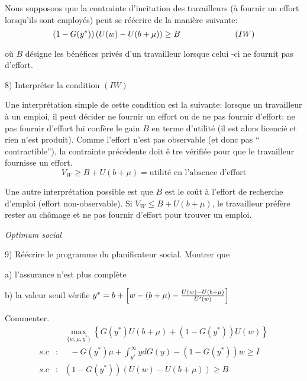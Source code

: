 \documentclass[a4paper]{article}
\begin{document}
\bigskip \pagebreak

Nous supposons que la contrainte d'incitation des travailleurs (\`{a}
fournir un effort lorsqu'ils sont employ\'{e}s) peut se r\'{e}\'{e}crire de
la mani\`{e}re suivante:%
\begin{equation*}
\left( 1-G(y^{\ast })\right) \left( U(w)-U(b+\mu )\right) \geq B\text{ \ \ \
\ \ \ \ \ \ \ \ \ \ \ \ \ \ \ \ }(IW)
\end{equation*}

o\`{u} $B$ d\'{e}signe les b\'{e}n\'{e}fices priv\'{e}s d'un travailleur
lorsque celui -ci ne fournit pas d'effort.

\bigskip

8) Interpr\'{e}ter la condition $(IW)$

\bigskip

Une interpr\'{e}tation simple de cette condition est la suivante: lorsque un
travailleur \`{a} un emploi, il peut d\'{e}cider ne fournir un effort ou de
ne pas fournir d'effort: ne pas fournir d'effort lui conf\`{e}re le gain $B$
en terme d'utilit\'{e} (il est alors licenci\'{e} et rien n'est produit).
Comme l'effort n'est pas observable (et donc pas \textquotedblleft
contractible\textquotedblright ), la contrainte pr\'{e}c\'{e}dente doit \^{e}%
tre v\'{e}rifi\'{e}e pour que le travailleur fournisse un effort.%
\begin{equation*}
V_{W}\geq B+U(b+\mu )=\text{utilit\'{e} en l'absence d'effort}
\end{equation*}

Une autre interpr\'{e}tation possible est que $B$ est le co\^{u}t \`{a}
l'effort de recherche d'emploi (effort non-observable). Si $V_{W}\leq
B+U(b+\mu )$, le travailleur pr\'{e}f\`{e}re rester au ch\^{o}mage et ne pas
fournir d'effort pour trouver un emploi.

\bigskip

\textit{Optimum social}

\bigskip

9) R\'{e}\'{e}crire le programme du planificateur social. Montrer que

a) l'assurance n'est plus compl\`{e}te

b) la valeur seuil v\'{e}rifie $y^{\ast }=b+\left[ w-(b+\mu )-\frac{%
U(w)-U(b+\mu )}{U^{\prime }(w)}\right] $

Commenter.%
\begin{eqnarray*}
&&\max_{\{w,\mu ,y^{\ast }\}}\left\{ G(y^{\ast })U(b+\mu )+\left(
1-G(y^{\ast })\right) U(w)\right\} \\
s.c &:&\text{ }-G(y^{\ast })\mu +\int_{y^{\ast }}^{\infty }ydG(y)-\left(
1-G(y^{\ast })\right) w\geq I \\
s.c &:&\left( 1-G(y^{\ast })\right) \left( U(w)-U(b+\mu )\right) \geq B
\end{eqnarray*}
\end{document}

